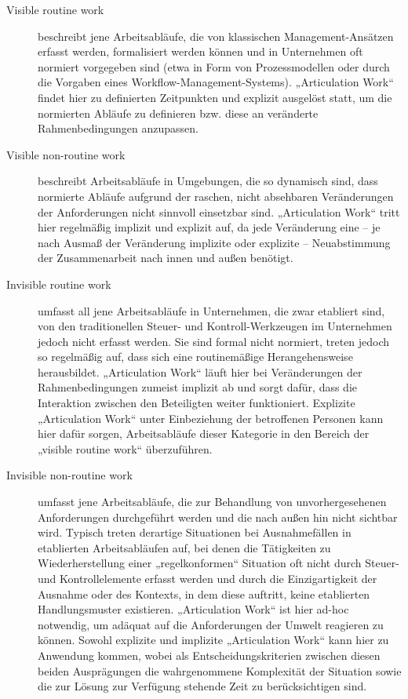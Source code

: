 \begin{description}
	\item[Visible routine work] beschreibt jene Arbeitsabläufe, die von klassischen Management-Ansätzen erfasst werden, formalisiert werden können und in Unternehmen oft normiert vorgegeben sind (etwa in Form von Prozessmodellen oder durch die Vorgaben eines Workflow-Management-Systems). „Articulation Work“ findet hier zu definierten Zeitpunkten und explizit ausgelöst statt, um die normierten Abläufe zu definieren bzw. diese an veränderte Rahmenbedingungen anzupassen. 
	\item[Visible non-routine work] beschreibt Arbeitsabläufe in Umgebungen, die so dynamisch sind, dass normierte Abläufe aufgrund der raschen, nicht absehbaren Veränderungen der Anforderungen nicht sinnvoll einsetzbar sind. „Articulation Work“ tritt hier regelmäßig implizit und explizit auf, da jede Veränderung eine -- je nach Ausmaß der Veränderung implizite oder explizite -- Neuabstimmung der Zusammenarbeit nach innen und außen benötigt.
	\item[Invisible routine work] umfasst all jene Arbeitsabläufe in Unternehmen, die zwar etabliert sind, von den traditionellen Steuer- und Kontroll-Werkzeugen im Unternehmen jedoch nicht erfasst werden. Sie sind formal nicht normiert, treten jedoch so regelmäßig auf, dass sich eine routinemäßige Herangehensweise herausbildet. „Articulation Work“ läuft hier bei Veränderungen der Rahmenbedingungen zumeist implizit ab und sorgt dafür, dass die Interaktion zwischen den Beteiligten weiter funktioniert. Explizite „Articulation Work“ unter Einbeziehung der betroffenen Personen kann hier dafür sorgen, Arbeitsabläufe dieser Kategorie in den Bereich der „visible routine work“ überzuführen.
	\item[Invisible non-routine work] umfasst jene Arbeitsabläufe, die zur Behandlung von unvorhergesehenen Anforderungen durchgeführt werden und die nach außen hin nicht sichtbar wird. Typisch treten derartige Situationen bei Ausnahmefällen in etablierten Arbeitsabläufen auf, bei denen die Tätigkeiten zu Wiederherstellung einer „regelkonformen“ Situation oft nicht durch Steuer- und Kontrollelemente erfasst werden und durch die Einzigartigkeit der Ausnahme oder des Kontexts, in dem diese auftritt, keine etablierten Handlungsmuster existieren. „Articulation Work“ ist hier ad-hoc notwendig, um adäquat auf die Anforderungen der Umwelt reagieren zu können. Sowohl explizite und implizite „Articulation Work“ kann hier zu Anwendung kommen, wobei als Entscheidungskriterien zwischen diesen beiden Ausprägungen die wahrgenommene Komplexität der Situation sowie die zur Lösung zur Verfügung stehende Zeit zu berücksichtigen sind.
\end{description}


